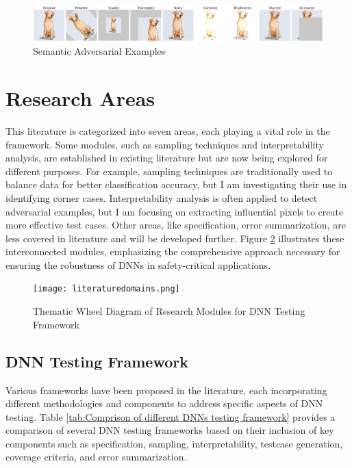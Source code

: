   \begin{figure}
    \centering
    \includegraphics[width=\linewidth]{figures/output_update.png}
    \caption{Semantic Adversarial Examples}
    \label{fig:image-trans}
  \end{figure}


\section{Research Areas}
 This literature is categorized into seven areas, each playing a vital role in the framework. Some modules, such as sampling techniques and interpretability analysis, are established in existing literature but are now being explored for different purposes. For example, sampling techniques are traditionally used to balance data for better classification accuracy, but I am investigating their use in identifying corner cases. Interpretability analysis is often applied to detect adversarial examples, but I am focusing on extracting influential pixels to create more effective test cases. Other areas, like specification, error summarization, are less covered in literature and will be developed further. Figure \ref{fig:thematic_wheel} illustrates these interconnected modules, emphasizing the comprehensive approach necessary for ensuring the robustness of DNNs in safety-critical applications. 

\begin{figure}[h]
  \centering
  \texttt{[image: literaturedomains.png]}
  \caption{Thematic Wheel Diagram of Research Modules for DNN Testing Framework}
  \label{fig:thematic_wheel}
\end{figure}

\subsection{DNN Testing Framework}
 Various frameworks have been proposed in the literature, each incorporating different methodologies and components to address specific aspects of DNN testing. Table \ref{tab:Comprison of different DNNs testing framework} provides a comparison of several DNN testing frameworks based on their inclusion of key components such as specification, sampling, interpretability, testcase generation, coverage criteria, and error summarization.

